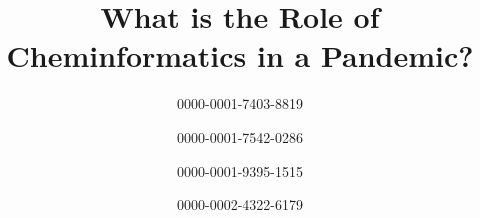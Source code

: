 \documentclass{bmcart}
\begin{document}
\begin{frontmatter}



\title{What is the Role of Cheminformatics in a Pandemic?}


\author[
   addressref={aff1},                   %
   email={rajarshi_guha@vrtx.com}   %
]{  0000-0001-7403-8819}
\author[
   addressref={aff2},                   %
   email={egon.willighagen@maastrichtuniversity.nl}   %
]{  0000-0001-7542-0286}
\author[
   addressref={aff3},                   %
   email={barbara.zdrazil@univie.ac.at}   %
]{  0000-0001-9395-1515}
\author[
   addressref={aff4},                   %
   email={jeliazkova.nina@gmail.com}   %
]{  0000-0002-4322-6179}



\end{frontmatter}
\end{document}
